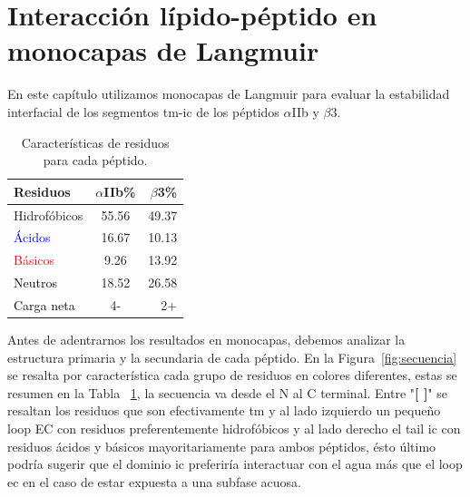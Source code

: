 \chapter*{Interacción lípido-péptido en monocapas de Langmuir} \label{mono}

 En este capítulo utilizamos monocapas de Langmuir para evaluar la estabilidad interfacial de los segmentos \ac{tm}-\ac{ic} de los péptidos $\alpha$IIb  y $\beta$3.


\begin{table}
\vspace{-1.2cm} %
    \caption{Características de residuos para cada péptido.}\label{wrap-tab:1}
    \label{tab:secuencia}
    \begin{tabular}{lcr}
     \toprule  %
      {Residuos} & {$\alpha$IIb\%} & {$\beta$3\%}\\
      \hline
        \textcolor{mygreen}{Hidrofóbicos}   & 55.56 & 49.37\\
        \textcolor{blue}{Ácidos}            & 16.67 & 10.13\\
        \textcolor{red}{Básicos}            & 9.26  & 13.92\\
        \textcolor{black}{Neutros}          & 18.52 & 26.58\\ %
      \bottomrule %
      \textcolor{black}{Carga neta}            & 4-  & 2+\\
      \bottomrule %
    \end{tabular}
    \vspace{-0.5cm} %
    \end{table} 
Antes de adentrarnos los resultados en monocapas, debemos analizar la estructura primaria y la secundaria de cada péptido. En la Figura~\ref{fig:secuencia} se resalta por característica cada grupo de residuos en colores diferentes, estas se resumen en la Tabla ~\ref{tab:secuencia}, la secuencia va desde el N al C terminal. Entre "\textbf{[ ]}" se resaltan los residuos que son efectivamente \ac{tm} y al lado izquierdo un pequeño loop \ac{EC} con residuos preferentemente hidrofóbicos y al lado derecho el tail \ac{ic} con residuos ácidos y básicos mayoritariamente para ambos péptidos, ésto último podría sugerir que el dominio \ac{ic} preferiría interactuar con el agua más que el loop \ac{ec} en el caso de estar expuesta a una subfase acuosa.

